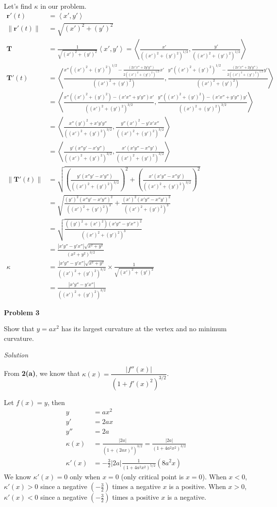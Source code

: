 \documentclass{article}
\newcommand{\lrp}[1]{\left( #1 \right)}
\newcommand{\lra}[1]{\left\langle #1 \right\rangle}
\newcommand{\T}[0]{\mathbf{T}}
\renewcommand{\r}[0]{\mathbf{r}}
\newcommand{\Solution}{\textit{Solution}}
\begin{document}
Let's find $\kappa$ in our problem.
\begin{align*}
    \r'(t)&=\lra{x',y'}\\
    \lVert \r'(t)\rVert&=\sqrt{(x')^2 + (y')^2}\\
    \T&=\frac{1}{\sqrt{(x')^2 + (y')^2}}\lra{x',y'}=\lra{\frac{x'}{((x')^2 + (y')^2)^{1/2}},\frac{y'}{((x')^2 + (y')^2)^{1/2}}}\\
    \T'(t) &=\lra{\frac{x''((x')^2 + (y')^2)^{1/2}-\frac{(2x'x''+2y'y'')}{2((x')^2+(y')^2)^{1/2}}x'}{((x')^2 + (y')^2)},\frac{y''((x')^2 + (y')^2)^{1/2}-\frac{(2x'x''+2y'y'')}{2((x')^2+(y')^2)^{1/2}}y'}{((x')^2 + (y')^2)}}\\
    &=\lra{\frac{x''((x')^2+(y')^2)-(x'x''+y'y'')x'}{((x')^2+(y')^2)^{3/2}},\frac{y''((x')^2+(y')^2)-(x'x''+y'y'')y'}{((x')^2+(y')^2)^{3/2}}}\\
    &=\lra{\frac{x''(y')^2 + x'y'y''}{((x')^2+(y')^2)^{3/2}},\frac{y''(x')^2-y'x'x''}{((x')^2+(y')^2)^{3/2}}}\\
    &=\lra{\frac{y'(x''y'-x'y'')}{((x')^2+(y')^2)^{3/2}},\frac{x'(x'y''-x''y')}{((x')^2+(y')^2)^{3/2}}}\\
    \lVert\T'(t)\rVert&=\sqrt{\lrp{\frac{y'(x''y'-x'y'')}{((x')^2+(y')^2)^{3/2}}}^2+\lrp{\frac{x'(x'y''-x''y')}{((x')^2+(y')^2)^{3/2}}}^2}\\
    &=\sqrt{\frac{(y')^2(x''y'-x'y'')^2}{((x')^2+(y')^2)^3}+\frac{(x')^2(x'y''-x''y')^2}{((x')^2+(y')^2)^3}}\\
    &=\sqrt{\frac{((y')^2 + (x')^2)(x'y''-y'x'')^2}{((x')^2+(y')^2)^3}}\tag{$(x''y'-x'y'')^2=(x'y''-x''y')^2$}\\
    &=\frac{\left|x'y''-y'x''\right|\sqrt{x^2+y^2}}{(x^2+y^2)^{3/2}}\\
    \kappa&=\frac{\left|x'y''-y'x''\right|\sqrt{x^2+y^2}}{((x')^2+(y')^2)^{3/2}}\times\frac{1}{\sqrt{(x')^2+(y')^2}}\\
    &=\boxed{\frac{\left|x'y''-y'x''\right|}{((x')^2+(y')^2)^{3/2}}}
\end{align*}
\newpage
{}
{}\textbf{Problem 3} 

Show that $y=ax^2$ has its largest curvature at the vertex and no minimum curvature.

\Solution

From \textbf{2(a)}, we know that $\displaystyle\kappa (x)=\dfrac{\left|f''(x)\right|}{(1+f'(x)^2)^{3/2}}$.

Let $f(x)=y$, then
\begin{align*}
    y&=ax^2\\
    y'&=2ax\\
    y''&=2a\\
    \kappa(x) &=\frac{\left|2a\right|}{(1+(2ax)^2)^{3/2}}=\frac{\left|2a\right|}{(1+4a^2x^2)^{3/2}}\\
    \kappa '(x)&=-\frac{3}{2}\left|2a\right|\frac{1}{(1+4a^2x^2)^{5/2}}(8a^2x)
\end{align*}
We know $\kappa'(x)=0$ only when $x=0$ (only critical point is $x=0$). When $x<0$, $\kappa'(x)>0$ since a negative $\lrp{-\frac{3}{2}}$ times a negative $x$ is a positive. When $x>0$, $\kappa'(x)<0$ since a negative $\lrp{-\frac{3}{2}}$ times a positive $x$ is a negative.
\end{document}
